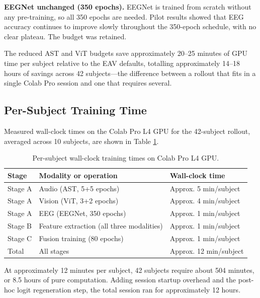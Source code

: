 \textbf{EEGNet unchanged (350 epochs).} EEGNet is trained from scratch without any pre-training, so all 350 epochs are needed. Pilot results showed that EEG accuracy continues to improve slowly throughout the 350-epoch schedule, with no clear plateau. The budget was retained.

The reduced AST and ViT budgets save approximately 20--25 minutes of GPU time per subject relative to the EAV defaults, totalling approximately 14--18 hours of savings across 42 subjects---the difference between a rollout that fits in a single Colab Pro session and one that requires several.

\subsection{Per-Subject Training Time}
Measured wall-clock times on the Colab Pro L4 GPU for the 42-subject rollout, averaged across 10 subjects, are shown in Table \ref{tab:training_times}.

\begin{table}[htbp]
\centering
\small
\caption{Per-subject wall-clock training times on Colab Pro L4 GPU.}
\label{tab:training_times}
\begin{tabular}{p{3.4cm} p{6.6cm} p{3.3cm}}
\hline
\textbf{Stage} & \textbf{Modality or operation} & \textbf{Wall-clock time} \\
\hline
Stage A & Audio (AST, 5+5 epochs) & Approx. 5 min/subject \\
Stage A & Vision (ViT, 3+2 epochs) & Approx. 4 min/subject \\
Stage A & EEG (EEGNet, 350 epochs) & Approx. 1 min/subject \\
Stage B & Feature extraction (all three modalities) & Approx. 1 min/subject \\
Stage C & Fusion training (80 epochs) & Approx. 1 min/subject \\
Total & All stages & Approx. 12 min/subject \\
\hline
\end{tabular}
\end{table}

At approximately 12 minutes per subject, 42 subjects require about 504 minutes, or 8.5 hours of pure computation. Adding session startup overhead and the post-hoc logit regeneration step, the total session ran for approximately 12 hours.


